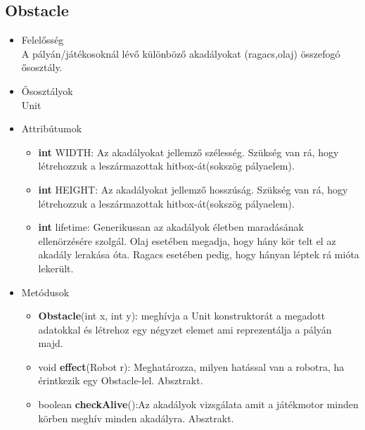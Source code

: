 \subsection{Obstacle}
\begin{itemize}
\item Felelősség\\
A pályán/játékosoknál lévő különböző akadályokat (ragacs,olaj) összefogó ősosztály.
\item Ősosztályok\\
Unit
\item Attribútumok
	\begin{itemize}
		\item \textbf{int} WIDTH: Az akadályokat jellemző szélesség. Szükség van rá, hogy létrehozzuk a leszármazottak hitbox-át(sokszög pályaelem).
		\item \textbf{int} HEIGHT: Az akadályokat jellemző hosszúság. Szükség van rá, hogy létrehozzuk a leszármazottak hitbox-át(sokszög pályaelem).
			\item \textbf{int} lifetime: Generikussan az akadályok életben maradásának ellenörzésére szolgál. Olaj esetében megadja, hogy hány kör telt el az akadály lerakása óta. Ragacs esetében pedig, hogy hányan léptek rá mióta lekerült. 
	\end{itemize}
\item Metódusok
	\begin{itemize}
		\item \textbf{Obstacle}(int x, int y): meghívja a Unit konstruktorát a megadott adatokkal és létrehoz egy négyzet elemet ami reprezentálja a pályán majd.
		\item void \textbf{effect}(Robot r): Meghatározza, milyen hatással van a robotra, ha érintkezik egy Obstacle-lel. Absztrakt.
		\item boolean \textbf{checkAlive}():Az akadályok vizsgálata amit a játékmotor minden körben meghív minden akadályra. Absztrakt.
	\end{itemize}
\end{itemize}

